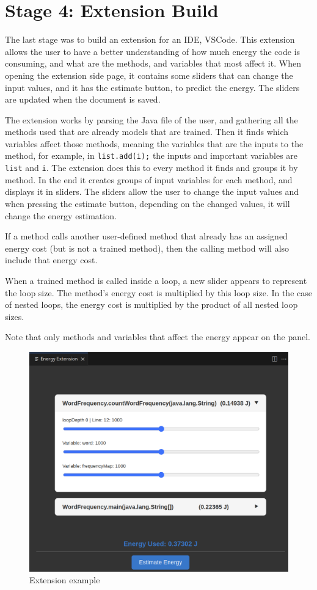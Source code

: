\section{Stage 4: Extension Build} \label{sec:work_stage4_extension_build}

The last stage was to build an extension for an IDE, VSCode. This extension allows the user to have a better understanding of how much energy the code is consuming, and what are the methods, and variables that most affect it.
When opening the extension side page, it contains some sliders that can change the input values, and it has the estimate button, to predict the energy.
The sliders are updated when the document is saved.%

The extension works by parsing the Java file of the user, and gathering all the methods used that are already models that are trained. Then it finds which variables affect those methods, meaning the variables that are the inputs to the method, for example, in \texttt{list.add(i);}  the inputs and important variables are \texttt{list} and \texttt{i}.
The extension does this to every method it finds and groups it by method. In the end it creates groups of input variables for each method, and displays it in sliders. The sliders allow the user to change the input values and when pressing the estimate button, depending on the changed values, it will change the energy estimation.

If a method calls another user-defined method that already has an assigned energy cost (but is not a trained method), then the calling method will also include that energy cost.

When a trained method is called inside a loop, a new slider appears to represent the loop size. The method’s energy cost is multiplied by this loop size. In the case of nested loops, the energy cost is multiplied by the product of all nested loop sizes.

Note that only methods and variables that affect the energy appear on the panel.

\begin{figure}[htbp]
  \centering
  \includegraphics[width = .8 \textwidth]{figures/extension_example1.png}
  \caption{Extension example}
  \label{fig:extension_example1}
\end{figure}

